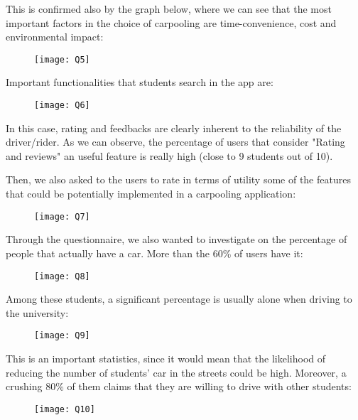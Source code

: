 \documentclass{article}
\begin{document}
This is confirmed also by the graph below, where we can see that the most important factors in the choice of carpooling are time-convenience, cost and environmental impact: 

\begin{figure}[htbp]
  \centering
     \texttt{[image: Q5]}
\end{figure}

Important functionalities that students search in the app are:

\begin{figure}[htbp]
  \centering
     \texttt{[image: Q6]}
\end{figure}

In this case, rating and feedbacks are clearly inherent to the reliability of the driver/rider. As we can observe, the percentage of users that consider "Rating and reviews" an useful feature is really high (close to 9 students out of 10). 
\newpage

Then, we also asked to the users to rate in terms of utility some of the features that could be potentially implemented in a carpooling application: 

\begin{figure}[htbp]
  \centering
     \texttt{[image: Q7]}
\end{figure}

Through the questionnaire, we also wanted to investigate on the percentage of people that actually have a car. More than the 60\% of users have it: 

\begin{figure}[htbp]
  \centering
     \texttt{[image: Q8]}
\end{figure}
\newpage

Among these students, a significant percentage is usually alone when driving to the university:

\begin{figure}[htbp]
  \centering
     \texttt{[image: Q9]}
\end{figure}

This is an important statistics, since it would mean that the likelihood of reducing the number of students’ car in the streets could be high. Moreover, a crushing 80\% of them claims that they are willing to drive with other students: 

\begin{figure}[htbp]
  \centering
     \texttt{[image: Q10]}
\end{figure}
\end{document}
